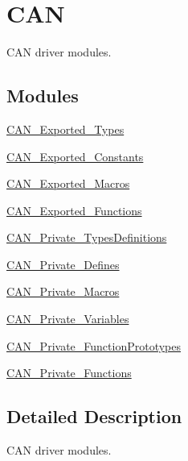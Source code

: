 \hypertarget{group___c_a_n}{}\section{C\+AN}
\label{group___c_a_n}


C\+AN driver modules.  


\subsection*{Modules}
\begin{DoxyCompactItemize}
\item 
\hyperlink{group___c_a_n___exported___types}{C\+A\+N\+\_\+\+Exported\+\_\+\+Types}
\item 
\hyperlink{group___c_a_n___exported___constants}{C\+A\+N\+\_\+\+Exported\+\_\+\+Constants}
\item 
\hyperlink{group___c_a_n___exported___macros}{C\+A\+N\+\_\+\+Exported\+\_\+\+Macros}
\item 
\hyperlink{group___c_a_n___exported___functions}{C\+A\+N\+\_\+\+Exported\+\_\+\+Functions}
\item 
\hyperlink{group___c_a_n___private___types_definitions}{C\+A\+N\+\_\+\+Private\+\_\+\+Types\+Definitions}
\item 
\hyperlink{group___c_a_n___private___defines}{C\+A\+N\+\_\+\+Private\+\_\+\+Defines}
\item 
\hyperlink{group___c_a_n___private___macros}{C\+A\+N\+\_\+\+Private\+\_\+\+Macros}
\item 
\hyperlink{group___c_a_n___private___variables}{C\+A\+N\+\_\+\+Private\+\_\+\+Variables}
\item 
\hyperlink{group___c_a_n___private___function_prototypes}{C\+A\+N\+\_\+\+Private\+\_\+\+Function\+Prototypes}
\item 
\hyperlink{group___c_a_n___private___functions}{C\+A\+N\+\_\+\+Private\+\_\+\+Functions}
\end{DoxyCompactItemize}


\subsection{Detailed Description}
C\+AN driver modules. 

